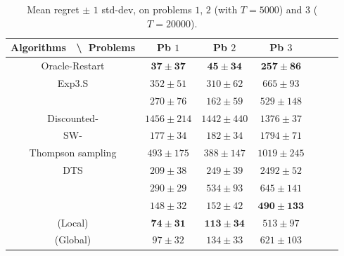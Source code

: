 \begin{table}[ht]
    \centering
    \begin{tabular}{c|cccccc}
    \textbf{Algorithms} $\;$ \textbackslash $\;$ \textbf{Problems} & Pb $1$ & Pb $2$ & Pb $3$ \\
        \hline
        Oracle-Restart \klUCB{} & $\mathbf{37 \pm 37}$ & $\mathbf{45 \pm 34}$ & $\mathbf{257 \pm 86}$ \\
        \hline
        Exp3.S & $352 \pm 51$ & $310 \pm 62$ & $665 \pm 93$ \\
        \hline
        \klUCB{} & $270 \pm 76$ & $162 \pm 59$ & $529 \pm 148$ \\
        Discounted-\klUCB{} & $1456 \pm 214$ & $1442 \pm 440$ & $1376 \pm 37$ \\
        SW-\klUCB{} & $177 \pm 34$ & $182 \pm 34$ & $1794 \pm 71$ \\
        \hline
        Thompson sampling & $493 \pm 175$ & $388 \pm 147$ & $1019 \pm 245$ \\
        DTS & $209 \pm 38$ & $249 \pm 39$ & $2492 \pm 52$ \\
        \hline
        \MklUCB{} & $290 \pm 29$ & $534 \pm 93$ & $645 \pm 141$ \\
        \CUSUMklUCB{} & $148 \pm 32$ & $152 \pm 42$ & $\mathbf{490 \pm 133}$ \\
        \hline
        \GLRklUCB{}(Local) & $\mathbf{74 \pm 31}$ & $\mathbf{113 \pm 34}$ & $513 \pm 97$ \\
        \GLRklUCB{}(Global) & $97 \pm 32$ & $134 \pm 33$ & $621 \pm 103$
    \end{tabular}
    \caption{Mean regret $\pm$ $1$ std-dev, on problems $1$, $2$ (with $T=5000$) and $3$ ($T=20000$).
    }
    \label{table:6:totalResults1}
\end{table}


